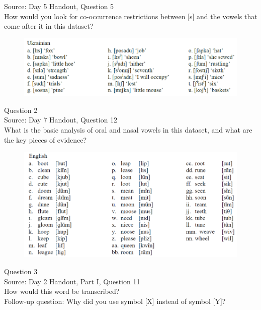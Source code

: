 \documentclass[12pt]{article}
\begin{document}
Source: Day 5 Handout, Question 5\\

How would you look for co-occurrence restrictions between [s] and the vowels that come after it in this dataset?\\

\begin{figure}[H]
\includegraphics{../images/ukrainian.png}
\end{figure}

\newpage

{\large Question 2}\\

Source: Day 7 Handout, Question 12\\

What is the basic analysis of oral and nasal vowels in this dataset, and what are the key pieces of evidence?\\

\begin{figure}[H]
\includegraphics{../images/english12.png}
\end{figure}

\newpage

{\large Question 3}\\

Source: Day 2 Handout, Part I, Question 11\\

How would this word be transcribed?\\ Follow-up question: Why did you use symbol [X] instead of symbol [Y]?\\
\end{document}
